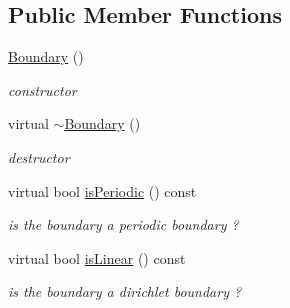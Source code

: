\subsection*{Public Member Functions}
\begin{DoxyCompactItemize}
\item 
\hypertarget{classnatrium_1_1natrium_1_1Boundary_a2fd9701faa34f52480eef8a2afb9d387}{
\hyperlink{classnatrium_1_1natrium_1_1Boundary_a2fd9701faa34f52480eef8a2afb9d387}{Boundary} ()}
\label{classnatrium_1_1natrium_1_1Boundary_a2fd9701faa34f52480eef8a2afb9d387}

\begin{DoxyCompactList}\small\item\em constructor \item\end{DoxyCompactList}\item 
\hypertarget{classnatrium_1_1natrium_1_1Boundary_a8a09a17f803acb05fbe9410841913232}{
virtual \hyperlink{classnatrium_1_1natrium_1_1Boundary_a8a09a17f803acb05fbe9410841913232}{$\sim$Boundary} ()}
\label{classnatrium_1_1natrium_1_1Boundary_a8a09a17f803acb05fbe9410841913232}

\begin{DoxyCompactList}\small\item\em destructor \item\end{DoxyCompactList}\item 
\hypertarget{classnatrium_1_1natrium_1_1Boundary_a56b517cd6273411041b7a108853ec2c3}{
virtual bool \hyperlink{classnatrium_1_1natrium_1_1Boundary_a56b517cd6273411041b7a108853ec2c3}{isPeriodic} () const }
\label{classnatrium_1_1natrium_1_1Boundary_a56b517cd6273411041b7a108853ec2c3}

\begin{DoxyCompactList}\small\item\em is the boundary a periodic boundary ? \item\end{DoxyCompactList}\item 
\hypertarget{classnatrium_1_1natrium_1_1Boundary_ae2ab7049e7ef6146936bb039bf2e4e5b}{
virtual bool \hyperlink{classnatrium_1_1natrium_1_1Boundary_ae2ab7049e7ef6146936bb039bf2e4e5b}{isLinear} () const }
\label{classnatrium_1_1natrium_1_1Boundary_ae2ab7049e7ef6146936bb039bf2e4e5b}

\begin{DoxyCompactList}\small\item\em is the boundary a dirichlet boundary ? \item\end{DoxyCompactList}\end{DoxyCompactItemize}


